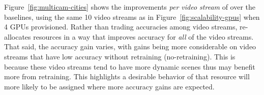 


% 

Figure~\ref{fig:multicam-cities} shows the improvements {\em per video stream} of \name over the baselines, using the same 10 video streams as in Figure~\ref{fig:scalability-gpus} when 4 GPUs provisioned. 
Rather than trading accuracies among video streams, \name re-allocates resources in a way that improves accuracy for {\em all} of the video streams. 
That said, the accuracy gain varies, with gains being more considerable on video streams that have low accuracy without retraining (no-retraining).
This is because these video streams tend to have more dynamic scenes thus may benefit more from retraining.
This highlights a desirable behavior of \name that resource will more likely to be assigned where more accuracy gains are expected.






